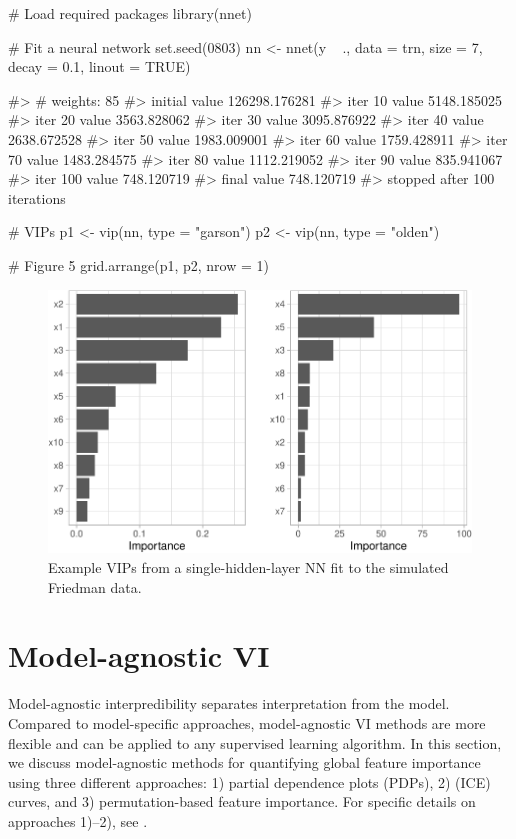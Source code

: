 \begin{Schunk}
\begin{Sinput}
# Load required packages
library(nnet)

# Fit a neural network
set.seed(0803)
nn <- nnet(y ~ ., data = trn, size = 7, decay = 0.1, linout = TRUE)
\end{Sinput}
\begin{Soutput}
#> # weights:  85
#> initial  value 126298.176281 
#> iter  10 value 5148.185025
#> iter  20 value 3563.828062
#> iter  30 value 3095.876922
#> iter  40 value 2638.672528
#> iter  50 value 1983.009001
#> iter  60 value 1759.428911
#> iter  70 value 1483.284575
#> iter  80 value 1112.219052
#> iter  90 value 835.941067
#> iter 100 value 748.120719
#> final  value 748.120719 
#> stopped after 100 iterations
\end{Soutput}
\begin{Sinput}
# VIPs
p1 <- vip(nn, type = "garson")
p2 <- vip(nn, type = "olden")

# Figure 5
grid.arrange(p1, p2, nrow = 1)
\end{Sinput}
\begin{figure}[!htb]

{\centering \includegraphics[width=0.7\linewidth]{greenwell-boehmke_files/figure-latex/vip-nnet-1} 

}

\caption[Example VIPs from a single-hidden-layer NN fit to the simulated Friedman data]{Example VIPs from a single-hidden-layer NN fit to the simulated Friedman data.}\label{fig:vip-nnet}
\end{figure}
\end{Schunk}

\section{Model-agnostic VI}

Model-agnostic interpredibility separates interpretation from the model.
Compared to model-specific approaches, model-agnostic VI methods are
more flexible and can be applied to any supervised learning algorithm.
In this section, we discuss model-agnostic methods for quantifying
global feature importance using three different approaches: 1) partial
dependence plots (PDPs), 2) 
(ICE) curves, and 3) permutation-based feature importance. For specific
details on approaches 1)--2), see \citet{greenwell-simple-2018}.

